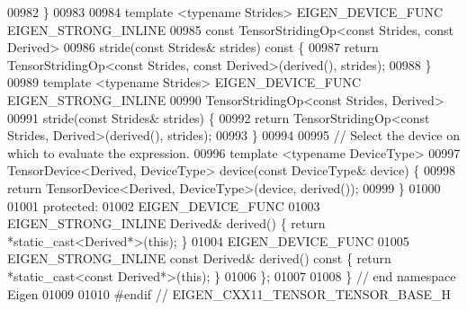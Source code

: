 \begin{DoxyCode}
00982     \}
00983 
00984     \textcolor{keyword}{template} <\textcolor{keyword}{typename} Str\textcolor{keywordtype}{id}es> EIGEN\_DEVICE\_FUNC EIGEN\_STRONG\_INLINE
00985     \textcolor{keyword}{const} TensorStridingOp<const Strides, const Derived>
00986     stride(\textcolor{keyword}{const} Strides& strides)\textcolor{keyword}{ const }\{
00987       \textcolor{keywordflow}{return} TensorStridingOp<const Strides, const Derived>(derived(), strides);
00988     \}
00989     \textcolor{keyword}{template} <\textcolor{keyword}{typename} Str\textcolor{keywordtype}{id}es> EIGEN\_DEVICE\_FUNC EIGEN\_STRONG\_INLINE
00990     TensorStridingOp<const Strides, Derived>
00991     stride(\textcolor{keyword}{const} Strides& strides) \{
00992       \textcolor{keywordflow}{return} TensorStridingOp<const Strides, Derived>(derived(), strides);
00993     \}
00994 
00995     \textcolor{comment}{// Select the device on which to evaluate the expression.}
00996     \textcolor{keyword}{template} <\textcolor{keyword}{typename} DeviceType>
00997     TensorDevice<Derived, DeviceType> device(\textcolor{keyword}{const} DeviceType& device) \{
00998       \textcolor{keywordflow}{return} TensorDevice<Derived, DeviceType>(device, derived());
00999     \}
01000 
01001  \textcolor{keyword}{protected}:
01002     EIGEN\_DEVICE\_FUNC
01003     EIGEN\_STRONG\_INLINE Derived& derived() \{ \textcolor{keywordflow}{return} *\textcolor{keyword}{static\_cast<}Derived*\textcolor{keyword}{>}(\textcolor{keyword}{this}); \}
01004     EIGEN\_DEVICE\_FUNC
01005     EIGEN\_STRONG\_INLINE \textcolor{keyword}{const} Derived& derived()\textcolor{keyword}{ const }\{ \textcolor{keywordflow}{return} *\textcolor{keyword}{static\_cast<}\textcolor{keyword}{const }Derived*\textcolor{keyword}{>}(\textcolor{keyword}{this}); \}
01006 \};
01007 
01008 \} \textcolor{comment}{// end namespace Eigen}
01009 
01010 \textcolor{preprocessor}{#endif // EIGEN\_CXX11\_TENSOR\_TENSOR\_BASE\_H}
\end{DoxyCode}
